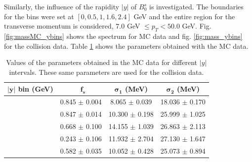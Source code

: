 Similarly, the influence of the rapidity $|y|$ of $B_0^s$ is investigated. The boundaries for the bins were set at $[0, 0.5, 1, 1.6, 2.4]$ GeV and the entire region for the transverse momentum is considered, $7.0$ GeV $\leq p_T < 50.0$ GeV. Fig. \ref{fig:massMC_ybins} shows the spectrum for MC data and fig. \ref{fig:mass_ybins} for the collision data. Table \ref{table:mc_ybins} shows the parameters obtained with the MC data.

\begin{table}[htp!]
	\begin{center}
		\begin{tabular}{|c|c|c|c|}
			\hline
			\textbf{$\mathbf{|y|}$ bin (GeV)} & \ $\mathbf{f_s}$ & \textbf{$\mathbf{\sigma_1}$ (MeV) }& \textbf{$\mathbf{\sigma_2}$ (MeV)}\\ \hline
			[0.0, 0.5] & 0.845 $\pm$ 0.004 & 8.065 $\pm$ 0.039 &18.036 $\pm$ 0.170\\ \hline 
			[0.5, 1.0] & 0.847 $\pm$ 0.014 & 10.300 $\pm$ 0.198 &25.999 $\pm$ 1.025\\ \hline 
			[1.0, 1.6] & 0.668 $\pm$ 0.100 & 14.155 $\pm$ 1.039 &26.863 $\pm$ 2.113\\ \hline 
			[1.6, 2.4] & 0.243 $\pm$ 0.106 & 11.932 $\pm$ 2.704 &27.130 $\pm$ 1.647\\ \hline 
			[0.0, 2.4] & 0.582 $\pm$ 0.035 & 10.052 $\pm$ 0.428 &25.073 $\pm$ 0.894\\ \hline 
		\end{tabular}
	\end{center}
\caption{Values of the parameters obtained in the MC data for different $|y|$ intervals. These same parameters are used for the collision data.}
\label{table:mc_ybins}
\end{table}

